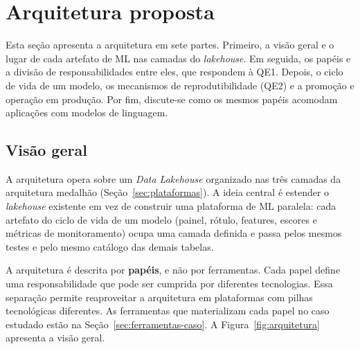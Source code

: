 \section{Arquitetura proposta}
\label{sec:arquitetura}

Esta seção apresenta a arquitetura em sete partes. Primeiro, a visão geral e o lugar de cada artefato de ML nas camadas do \textit{lakehouse}. Em seguida, os papéis e a divisão de responsabilidades entre eles, que respondem à QE1. Depois, o ciclo de vida de um modelo, os mecanismos de reprodutibilidade (QE2) e a promoção e operação em produção. Por fim, discute-se como os mesmos papéis acomodam aplicações com modelos de linguagem.

\subsection{Visão geral}

A arquitetura opera sobre um \textit{Data Lakehouse} \cite{armbrust2021} organizado nas três camadas da arquitetura medalhão (Seção~\ref{sec:plataformas}). A ideia central é estender o \textit{lakehouse} existente em vez de construir uma plataforma de ML paralela: cada artefato do ciclo de vida de um modelo (painel, rótulo, features, escores e métricas de monitoramento) ocupa uma camada definida e passa pelos mesmos testes e pelo mesmo catálogo das demais tabelas.

A arquitetura é descrita por \textbf{papéis}, e não por ferramentas. Cada papel define uma responsabilidade que pode ser cumprida por diferentes tecnologias. Essa separação permite reaproveitar a arquitetura em plataformas com pilhas tecnológicas diferentes. As ferramentas que materializam cada papel no caso estudado estão na Seção~\ref{sec:ferramentas-caso}. A Figura~\ref{fig:arquitetura} apresenta a visão geral.

